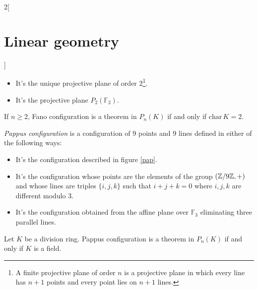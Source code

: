 \documentclass[../../../main.tex]{subfiles}
\begin{document}
\begin{multicols}{2}[\section{Linear geometry}]
\begin{definition}
\begin{itemize}
\begin{center}
            \end{center}
      \item It's the unique projective plane of order 2\footnote{A finite projective plane of order $n$ is a  projective plane in which every line has $n+1$ points and every point lies on $n+1$ lines.}.
      \item It's the projective plane $P_2(\mathbb{F}_2)$.
    \end{itemize}
  \end{definition}
  \begin{theorem}
    If $n\geq 2$, Fano configuration is a theorem in $P_n(K)$ if and only if $\text{char}\,K=2$.
  \end{theorem}
  \begin{definition}
    \textit{Pappus configuration} is a configuration of 9 points and 9 lines defined in either of the following ways:
    \begin{itemize}
      \item It's the configuration described in figure \ref{pap}.
            \begin{center}
              \begin{minipage}{\linewidth}
                \centering
                
                \label{pap}
              \end{minipage}
            \end{center}
      \item It's the configuration whose points are the elements of the group $(\mathbb{Z} /9\mathbb{Z} ,+)$ and whose lines are triples $\{i,j,k\}$ such that $i+j+k=0$ where $i,j,k$ are different modulo 3.
      \item It's the configuration obtained from the affine plane over $\mathbb{F}_3$ eliminating three parallel lines.
    \end{itemize}
  \end{definition}
  \begin{theorem}
    Let $K$ be a division ring. Pappus configuration is a theorem in $P_n(K)$ if and only if $K$ is a field.
  \end{theorem}

\end{multicols}
\end{document}
